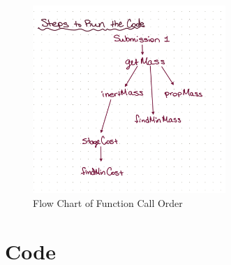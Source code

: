 \documentclass{article}
\begin{document}
\begin{figure}[H]
    \centering
    \includegraphics[width=0.65\textwidth]{./steps_to_run.png}
    \caption{Flow Chart of Function Call Order}
    \label{fig: steps_to_run}
\end{figure} 






\newpage
\section{Code}







\end{document}
